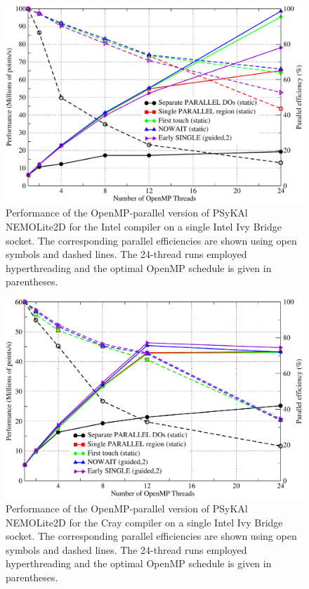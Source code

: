 \documentclass[gmd, manuscript]{copernicus}
\newlength{\picwidth}
\begin{document}
\begin{figure}
\centering
\includegraphics[width=\picwidth]{omp_scaling_256_intel}
\caption{Performance of the OpenMP-parallel version of {PS}y{KA}l
  NEMOLite2D for the Intel compiler on a single Intel Ivy Bridge
  socket.  The corresponding parallel efficiencies are shown using
  open symbols and dashed lines. The 24-thread runs employed
  hyperthreading and the optimal OpenMP schedule is given in
  parentheses.}
\label{FIG_intel_omp_256}
\end{figure}

\begin{figure}
\centering
\includegraphics[width=\picwidth]{omp_scaling_256_cray}
\caption{Performance of the OpenMP-parallel version of {PS}y{KA}l
  NEMOLite2D for the Cray compiler on a single Intel Ivy Bridge
  socket.  The corresponding parallel efficiencies are shown using
  open symbols and dashed lines. The 24-thread runs employed
  hyperthreading and the optimal OpenMP schedule is given in
  parentheses.}
\label{FIG_cray_omp_256}
\end{figure}
\end{document}
